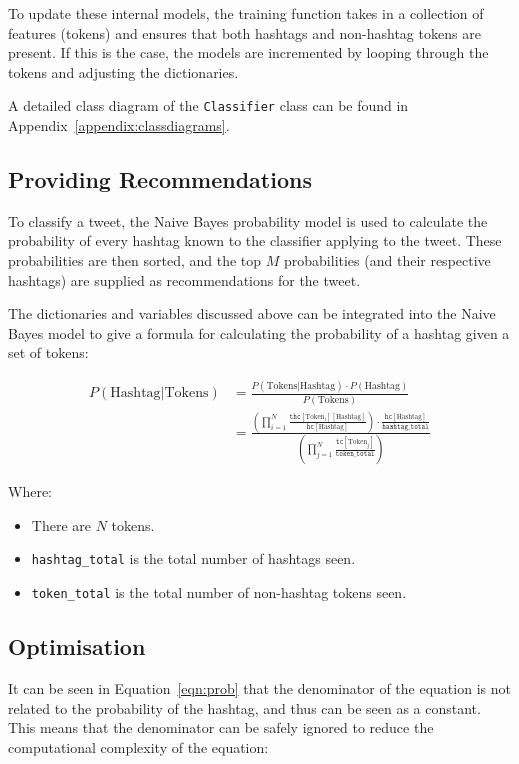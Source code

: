 \documentclass[11pt,a4paper]{report}
\begin{document}
To update these internal models, the training function takes in a collection of features (tokens) and ensures that both hashtags and non-hashtag tokens are present. If this is the case, the models are incremented by looping through the tokens and adjusting the dictionaries.

A detailed class diagram of the \texttt{Classifier} class can be found in Appendix~\ref{appendix:classdiagrams}.

\subsection{Providing Recommendations}
To classify a tweet, the Naive Bayes probability model is used to calculate the probability of every hashtag known to the classifier applying to the tweet. These probabilities are then sorted, and the top $M$ probabilities (and their respective hashtags) are supplied as recommendations for the tweet.

The dictionaries and variables discussed above can be integrated into the Naive Bayes model to give a formula for calculating the probability of a hashtag given a set of tokens:

\begin{align}
    P(\text{Hashtag}|\text{Tokens}) &= \frac{P(\text{Tokens}|\text{Hashtag}) \cdot P(\text{Hashtag})}{P(\text{Tokens})}\\
                                      &= \frac{\left(\prod\limits_{i=1}^{N} \frac{\mathtt{thc}[\text{Token}_i][\text{Hashtag}]}{\mathtt{hc}[\text{Hashtag}]}\right) \cdot \frac{\mathtt{hc}[\text{Hashtag}]}{\mathtt{hashtag\_total}}}{\left(\prod\limits_{j=1}^{N} \frac{\mathtt{tc}[\text{Token}_j]}{\mathtt{token\_total}}\right)}\label{eqn:prob}
\end{align}

Where:
\begin{itemize}
    \item There are $N$ tokens.
    \item \texttt{hashtag\_total} is the total number of hashtags seen.
    \item \texttt{token\_total} is the total number of non-hashtag tokens seen.
\end{itemize}

\subsection{Optimisation}
\label{ssec:optimisation}
It can be seen in Equation~\ref{eqn:prob} that the denominator of the equation is not related to the probability of the hashtag, and thus can be seen as a constant. This means that the denominator can be safely ignored to reduce the computational complexity of the equation:
\end{document}
